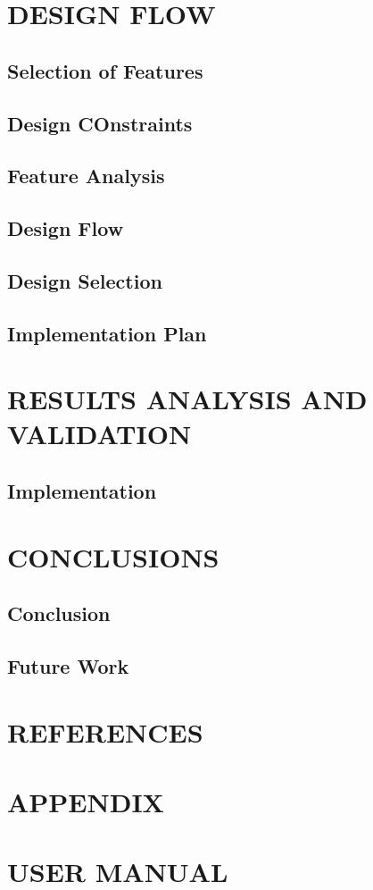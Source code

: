\documentclass[14pt]{extarticle}
\begin{document}
\newpage
\section{DESIGN FLOW}

\subsection{Selection of Features}
\subsection{Design COnstraints}
\subsection{Feature Analysis}
\subsection{Design Flow}
\subsection{Design Selection}
\subsection{Implementation Plan}


\newpage
\section{RESULTS ANALYSIS AND VALIDATION}

\subsection{Implementation}



\newpage
\section{CONCLUSIONS}

\subsection{Conclusion}
\subsection{Future Work}


\newpage
{}
\section*{REFERENCES}


\newpage
{}
\section*{APPENDIX}


\newpage
{}
\section*{USER MANUAL}
\end{document}
